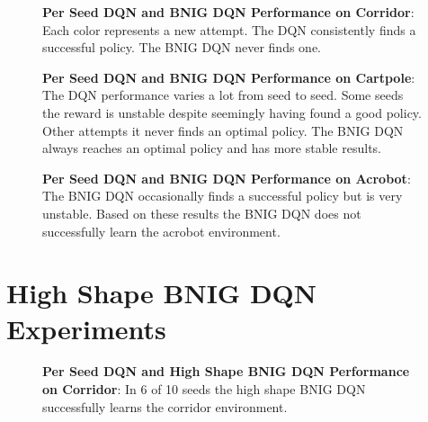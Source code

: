 {{\begin{figure}[H]
    \centering
    \caption{\textbf{Per Seed DQN and BNIG DQN Performance on Corridor}:  Each color represents a new attempt. The DQN consistently finds a successful policy. The BNIG DQN never finds one.}
    \label{fig:nn_per_corridor}
\end{figure}


\begin{figure}[H]
    \centering
    \caption{\textbf{Per Seed DQN and BNIG DQN Performance on Cartpole}: The DQN performance varies a lot from seed to seed. Some seeds the reward is unstable despite seemingly having found a good policy. Other  attempts it never finds an optimal policy. The BNIG DQN always reaches an optimal policy and has more stable results.}
    \label{fig:nn_per_cartpole}
\end{figure}

\begin{figure}[H]
    \centering
    \caption{\textbf{Per Seed DQN and BNIG DQN Performance on Acrobot}: The BNIG DQN occasionally finds a successful policy but is very unstable. Based on these results the BNIG DQN does not successfully learn the acrobot environment.}
    \label{fig:nn_per_acrobot}
\end{figure}

\section{High Shape BNIG DQN Experiments}


\begin{figure}[H]
    \centering
    \caption{\textbf{Per Seed DQN and High Shape BNIG DQN Performance on Corridor}: In 6 of 10 seeds the high shape BNIG DQN successfully learns the corridor environment.}
    \label{fig:alpha_nn_per_corridor}
\end{figure}


}}
